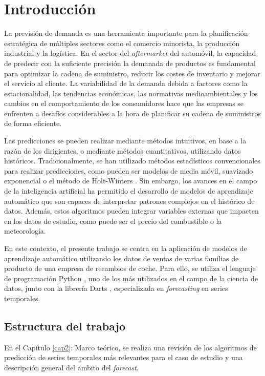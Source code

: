 \chapter{Introducción}\label{cap1}

La previsión de demanda es una herramienta importante para la planificación estratégica de múltiples sectores como el comercio minorista, la producción industrial y la logística. En el sector del \textit{aftermarket} del automóvil, la capacidad de predecir con la suficiente precisión la demanada de productos es fundamental para optimizar la cadena de suministro, reducir los costes de inventario y mejorar el servicio al cliente. La variabilidad de la demanda debida a factores como la estacionalidad, las tendencias económicas, las normativas medioambientales y los cambios en el comportamiento de los consumidores hace que las empresas se enfrenten a desafíos considerables a la hora de planificar su cadena de suministros de forma eficiente.

Las predicciones se pueden realizar mediante métodos intuitivos, en base a la razón de los dirigientes, o mediante métodos cuantitativos, utilizando datos históricos. Tradicionalmente, se han utilizado métodos estadísticos convencionales para realizar predicciones, como pueden ser modelos de media móvil, suavizado exponencial o el método de Holt-Winters \cite{winters}. Sin embargo, los avances en el campo de la inteligencia artificial ha permitido el desarrollo de modelos de aprendizaje automático que son capaces de interpretar patrones complejos en el histórico de datos. Además, estos algoritmos pueden integrar variables externas que impacten en los datos de estudio, como puede ser el precio del combustible o la meteorología.

En este contexto, el presente trabajo se centra en la aplicación de modelos de aprendizaje automático utilizando los datos de ventas de varias familias de producto de una empresa de recambios de coche. Para ello, se utiliza el lenguaje de programación Python \cite{python}, uno de los más utilizados en el campo de la ciencia de datos, junto con la librería Darts \cite{darts}, especializada en \textit{forecasting} en series temporales.

\section{Estructura del trabajo}

En el Capítulo \ref{cap2}: Marco teórico, se realiza una revisión de los algoritmos de predicción de series temporales más relevantes para el caso de estudio y una descripción general del ámbito del \textit{forecast}.

